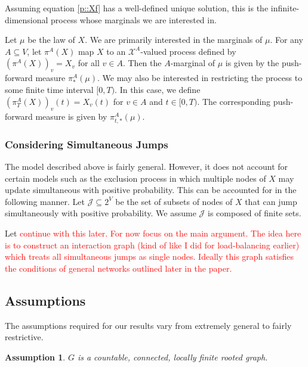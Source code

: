 \documentclass[12pt]{article}
\newcommand{\mc}{\mathcal}
\newcommand{\tr}{\textcolor{red}}
\newcommand{\ind}{\hspace{24pt}}
\newcommand{\sta}{\mc{X}}							%
\newcommand{\Xf}{X}									%
\newcommand{\m}{\mu}								%
\newcommand{\proj}{\pi}								%
\newcommand{\vind}[1]{_{#1}}						%
\newcommand{\tme}[1]{(#1)}							%
\newcommand{\vpara}[1]{^{#1}}						%
\newcommand{\tpara}[1]{_{#1}}						%
\newcommand{\psf}{_*}								%
\newcommand{\tparapsf}[1]{_{#1,*}}					%
\newcommand{\Jmps}{\mc{J}}							%
\newtheorem{assu}[thms]{Assumption}
\begin{document}
Assuming equation \eqref{p::Xf} has a well-defined unique solution, this is the infinite-dimensional process whose marginals we are interested in.

\ind Let \(\m\) be the law of \(\Xf\). We are primarily interested in the marginals of \(\m\). For any \(A \subseteq V\), let \(\proj\vpara{A}(\Xf)\) map \(\Xf\) to an \(\sta^A\)-valued process defined by \((\proj\vpara{A}(\Xf))\vind{v} = \Xf\vind{v}\) for all \(v\in A\). Then the \(A\)-marginal of \(\m\) is given by the push-forward measure \(\proj\vpara{A}\psf(\m)\). We may also be interested in restricting the process to some finite time interval \([0,T)\). In this case, we define \((\proj\vpara{A}\tpara{T}(\Xf))\vind{v}\tme{t} = \Xf\vind{v}\tme{t}\) for \(v \in A\) and \(t \in [0,T)\). The corresponding push-forward measure is given by \(\proj\vpara{A}\tparapsf{t}(\m)\).

\subsubsection{Considering Simultaneous Jumps}
\label{sim::p}

The model described above is fairly general. However, it does not account for certain models such as the exclusion process in which multiple nodes of \(\Xf\) may update simultaneous with positive probability. This can be accounted for in the following manner. Let \(\Jmps \subseteq 2^V\) be the set of subsets of nodes of \(\Xf\) that can jump simultaneously with positive probability. We assume \(\Jmps\) is composed of finite sets. 

Let \tr{continue with this later. For now focus on the main argument. The idea here is to construct an interaction graph (kind of like I did for load-balancing earlier) which treats all simultaneous jumps as single nodes. Ideally this graph satisfies the conditions of general networks outlined later in the paper.}

\subsection{Assumptions}
\label{a::not}

The assumptions required for our results vary from extremely general to fairly restrictive.

\begin{assu}
\(G\) is a countable, connected, locally finite rooted graph.
\label{a::gbasics}
\end{assu}
\end{document}

